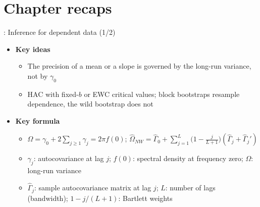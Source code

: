 \section{Chapter recaps}

\begin{frame}{: Inference for dependent data (1/2)}
\itemsize{\footnotesize}
\begin{itemize}
    \item \textbf{Key ideas}
    \begin{itemize}
        \item The precision of a mean or a slope is governed by the long-run variance, not by $\gamma_0$
        \item HAC with fixed-$b$ or EWC critical values; block bootstraps resample dependence, the wild bootstrap does not
    \end{itemize}
    \item \textbf{Key formula}
    \begin{itemize}
        \item $\Omega = \gamma_0 + 2\sum_{j\ge1}\gamma_j = 2\pi f(0)$; $\hat\Omega_{NW} = \hat\Gamma_0 + \sum_{j=1}^{L}\big(1 - \frac{j}{L+1}\big)(\hat\Gamma_j + \hat\Gamma_j')$
        \item $\gamma_j$: autocovariance at lag $j$; $f(0)$: spectral density at frequency zero; $\Omega$: long-run variance
        \item $\hat\Gamma_j$: sample autocovariance matrix at lag $j$; $L$: number of lags (bandwidth); $1 - j/(L + 1)$: Bartlett weights
    \end{itemize}
\end{itemize}
\end{frame}

